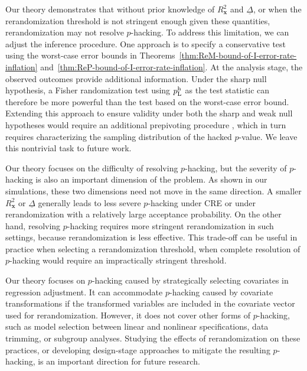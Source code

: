 \documentclass[12pt]{article}
\newcommand{\bs}{\boldsymbol}
\newcommand{\hpL}{p_\textnormal{L}^{\textnormal{h}}}
\newcommand{\lx}[1]{#1}
\begin{document}
Our theory demonstrates that without prior knowledge of $R^2_{\bs{x}}$ and $\underline{\Delta}$, or when the 
rerandomization threshold is not stringent enough given these quantities, rerandomization may not resolve $p$-hacking. To address this limitation, we can adjust the inference procedure. One approach is to specify a conservative test using the worst-case error bounds in Theorems~\ref{thm:ReM-bound-of-I-error-rate-inflation} and~\ref{thm:ReP-bound-of-I-error-rate-inflation}. \lx{At the analysis stage, the observed outcomes provide additional
information. Under the sharp null hypothesis, a Fisher randomization test
using $\hpL$ as the test statistic can therefore be more powerful than the
test based on the worst-case error bound. Extending this approach to ensure
validity under both the sharp and weak null hypotheses would require an
additional prepivoting procedure \citep{cohen2021prepivoting}, which in
turn requires characterizing the sampling distribution of the hacked
$p$-value. We leave this nontrivial task to future work.}

\lx{Our theory focuses on the difficulty of resolving $p$-hacking, but the
severity of $p$-hacking is also an important dimension of the problem. As
shown in our simulations, these two dimensions need not move in the same
direction. A smaller $R^2_{\bs{x}}$ or $\underline{\Delta}$ generally leads
to less severe $p$-hacking under CRE or under rerandomization with a
relatively large acceptance probability. On the other hand, resolving
$p$-hacking requires more stringent rerandomization in such settings,
because rerandomization is less effective. This trade-off can be useful in
practice when selecting a rerandomization threshold, when
complete resolution of $p$-hacking would require an impractically stringent
threshold.} 

\lx{Our theory focuses on $p$-hacking caused by strategically selecting covariates in regression adjustment.
It can accommodate $p$-hacking caused by covariate transformations if
the transformed variables are included in the covariate vector used for
rerandomization. However, it does
not cover other forms of $p$-hacking, such as model selection between linear and nonlinear specifications, data
trimming, or subgroup analyses. Studying the effects of rerandomization on
these practices, or developing design-stage approaches to mitigate the
resulting $p$-hacking, is an important direction for future research.}

\end{document}
